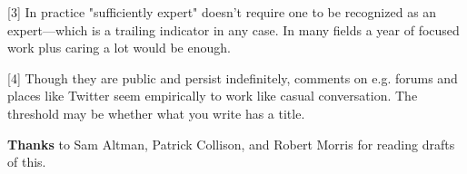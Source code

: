 [3] In practice "sufficiently expert" doesn't require one to be
                  recognized as an expert---which is a trailing indicator in
                  any case. In many fields a year of focused work plus caring a
                  lot would be enough.

[4] Though they are public and persist indefinitely, comments
                  on e.g. forums and places like Twitter seem empirically to
                  work like casual conversation. The threshold may be whether
                  what you write has a title.


                  \textbf{Thanks} to Sam Altman, Patrick Collison, and Robert
                  Morris for reading drafts of this.


              
            
          
